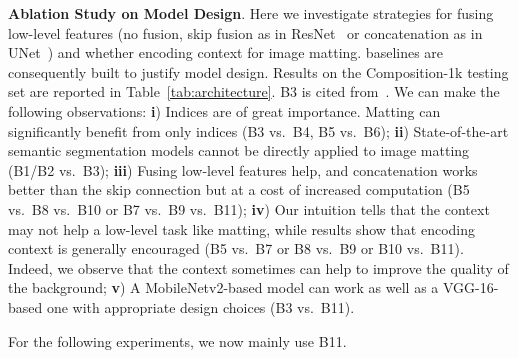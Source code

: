 \documentclass[10pt,twocolumn,letterpaper]{article}
\begin{document}
\vspace{3pt}
\noindent\textbf{Ablation Study on Model Design}. Here we investigate strategies for fusing low-level features (no fusion, skip fusion as in ResNet~\cite{he2016deep} or concatenation as in UNet~\cite{ronneberger2015u}) and whether encoding context for image matting.  baselines are consequently built to justify model design. Results on the Composition-1k testing set are reported in Table~\ref{tab:architecture}. B3 is cited from~\cite{xu2017deep}. We can make the following observations: \textbf{i}) Indices are of great importance. Matting can significantly benefit from only indices (B3 vs.\ B4, B5 vs.\ B6); \textbf{ii}) State-of-the-art semantic segmentation models cannot be directly applied to image matting (B1/B2 vs.\  B3); \textbf{iii}) Fusing low-level features help, and concatenation works better than the skip connection but at a cost of increased computation (B5 vs.\ B8 vs.\ B10 or B7 vs.\ B9 vs.\ B11); \textbf{iv}) Our intuition tells that the context may not help a low-level task like matting, while results show that encoding context is generally encouraged (B5 vs.\  B7 or B8 vs.\ B9 or B10 vs.\  B11). Indeed, we observe that the context sometimes can help to improve the quality of the background; \textbf{v}) A MobileNetv2-based model can work as well as a VGG-16-based one with appropriate design choices (B3 vs.\ B11).

For the following experiments, we now mainly use B11.
\end{document}
